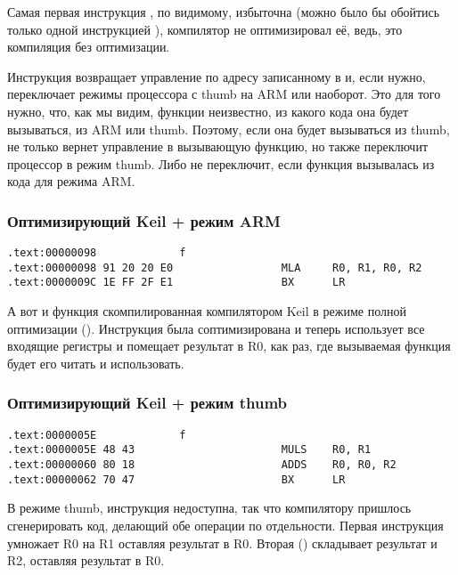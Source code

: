 Самая первая инструкция , по видимому, избыточна (можно было бы обойтись только одной инструкцией 
), компилятор не оптимизировал её, ведь, это компиляция без оптимизации.

Инструкция  возвращает управление по адресу записанному в \LR и, если нужно, переключает режимы процессора
с thumb на ARM или наоборот. Это для того нужно, что, как мы видим, функции  неизвестно, из какого кода
она будет вызываться, из ARM или thumb. Поэтому, если она будет вызываться из thumb,  не только вернет
управление в вызывающую функцию, но также переключит процессор в режим thumb. Либо не переключит, если функция
вызывалась из кода для режима ARM.

\subsubsection{Оптимизирующий Keil + режим ARM}

\begin{lstlisting}
.text:00000098             f
.text:00000098 91 20 20 E0                 MLA     R0, R1, R0, R2
.text:0000009C 1E FF 2F E1                 BX      LR
\end{lstlisting}

А вот и функция  скомпилированная компилятором Keil в режиме полной оптимизации (\Othree). Инструкция \MOV была
соптимизирована и теперь  использует все входящие регистры и помещает результат в R0, как раз, где
вызываемая функция будет его читать и использовать.

\subsubsection{Оптимизирующий Keil + режим thumb}

\begin{lstlisting}
.text:0000005E             f
.text:0000005E 48 43                       MULS    R0, R1
.text:00000060 80 18                       ADDS    R0, R0, R2
.text:00000062 70 47                       BX      LR
\end{lstlisting}

В режиме thumb, инструкция  недоступна, так что компилятору пришлось сгенерировать код, делающий
обе операции по отдельности. Первая инструкция  умножает R0 на R1 оставляя результат в R0. 
Вторая () складывает результат и R2, оставляя результат в R0.

